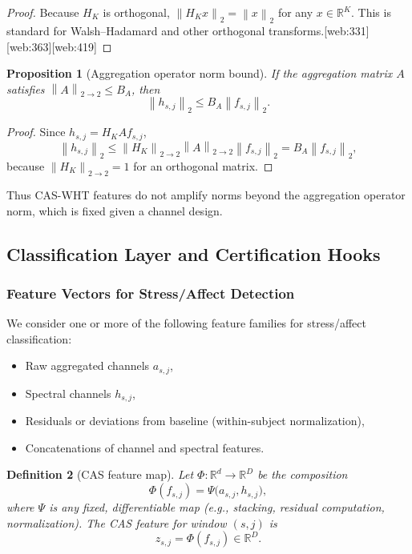\documentclass[11pt]{article}
\newtheorem{definition}{Definition}[section]
\newtheorem{proposition}[definition]{Proposition}
\newcommand{\R}{\mathbb{R}}
\newcommand{\norm}[1]{\left\lVert #1 \right\rVert}
\begin{document}
\begin{proof}
Because \(H_K\) is orthogonal, \(\norm{H_K x}_2 = \norm{x}_2\) for any \(x \in \R^K\).
This is standard for Walsh--Hadamard and other orthogonal transforms.\cite{WHTOverview,WHTOrthogonal}[web:331][web:363][web:419]
\end{proof}

\begin{proposition}[Aggregation operator norm bound]
If the aggregation matrix \(A\) satisfies \(\norm{A}_{2\to2} \le B_A\), then
\[
  \norm{h_{s,j}}_2 \le B_A \norm{f_{s,j}}_2.
\]
\end{proposition}

\begin{proof}
Since \(h_{s,j} = H_K A f_{s,j}\),
\[
  \norm{h_{s,j}}_2 \le \norm{H_K}_{2\to2} \norm{A}_{2\to2} \norm{f_{s,j}}_2 = B_A \norm{f_{s,j}}_2,
\]
because \(\norm{H_K}_{2\to2} = 1\) for an orthogonal matrix.
\end{proof}

Thus CAS-WHT features do not amplify norms beyond the aggregation operator norm, which is fixed given a channel design.

\subsection{Classification Layer and Certification Hooks}

\subsubsection{Feature Vectors for Stress/Affect Detection}

We consider one or more of the following feature families for stress/affect classification:

\begin{itemize}
  \item Raw aggregated channels \(a_{s,j}\),
  \item Spectral channels \(h_{s,j}\),
  \item Residuals or deviations from baseline (within-subject normalization),
  \item Concatenations of channel and spectral features.
\end{itemize}

\begin{definition}[CAS feature map]
Let \(\Phi : \R^d \to \R^D\) be the composition
\[
  \Phi(f_{s,j}) = \Psi\bigl( a_{s,j}, h_{s,j}\bigr),
\]
where \(\Psi\) is any fixed, differentiable map (e.g., stacking, residual computation, normalization).
The CAS feature for window \((s,j)\) is
\[
  z_{s,j} = \Phi(f_{s,j}) \in \R^D.
\]
\end{definition}
\end{document}
